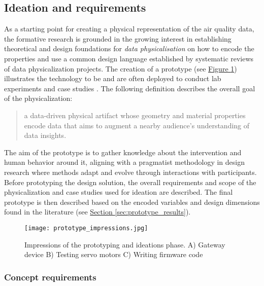 \subsection{Ideation and requirements}
\label{sec:ideation}

As a starting point for creating a physical representation of the air quality data, the formative research is grounded in the growing interest in establishing theoretical and design foundations for \textit{data physicalisation} \cite{hornecker_design_2023, sauve_physecology_2022, bae_making_2022} on how to encode the properties and use a common design language \cite{ranasinghe_encoding_2023, sosa_data_2018} established by systematic reviews of data physicalization projects. The creation of a prototype (see \hyperref[fig:prototype-impressions]{Figure \ref*{fig:prototype-impressions}}) illustrates the technology to be and are often deployed to conduct lab experiments and case studies \cite{jonathan_lazar_research_2017}. The following definition describes the overall goal of the physicalization:

\begin{quote}
a data-driven physical artifact whose geometry and material properties encode data that aims to augment a nearby audience’s understanding of data insights.
\end{quote}


The aim of the prototype is to gather knowledge about the intervention and human behavior around it, aligning with a pragmatist methodology in design research where methods adapt and evolve through interactions with participants. Before prototyping the design solution, the overall requirements and scope of the physicalization and case studies used for ideation are described. The final prototype is then described based on the encoded variables and design dimensions found in the literature (see \hyperref[sec:prototype_results]{Section \ref*{sec:prototype_results}}).

\begin{figure}[b]
    \centering
    \texttt{[image: prototype\_impressions.jpg]}
    \caption{Impressions of the prototyping and ideations phase. A) Gateway device B) Testing servo motors C) Writing firmware code}
    \label{fig:prototype-impressions}
\end{figure}

\subsubsection{Concept requirements}

